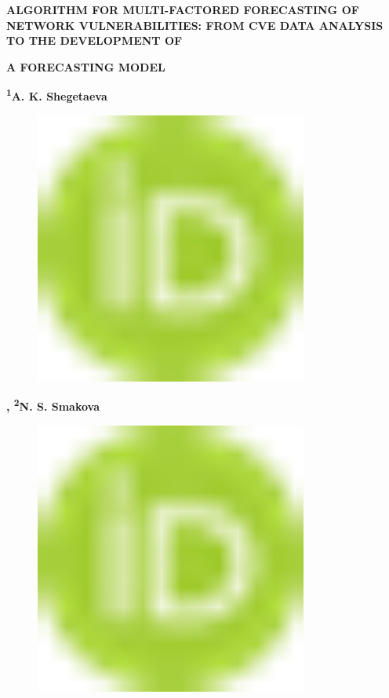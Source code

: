
{\bfseries ALGORITHM FOR MULTI-FACTORED FORECASTING OF NETWORK
VULNERABILITIES: FROM CVE DATA ANALYSIS TO THE DEVELOPMENT OF}

{\bfseries A FORECASTING MODEL}

{\bfseries \textsuperscript{1}A. K.
Shegetaeva}
\begin{figure}[H]
	\centering
	\includegraphics[width=0.8\textwidth]{media/ict2/image1}
	\caption*{}
\end{figure}
{\bfseries \textsuperscript{\envelope },
\textsuperscript{2}N. S.
Smakova}
\begin{figure}[H]
	\centering
	\includegraphics[width=0.8\textwidth]{media/ict2/image1}
	\caption*{}
\end{figure}
